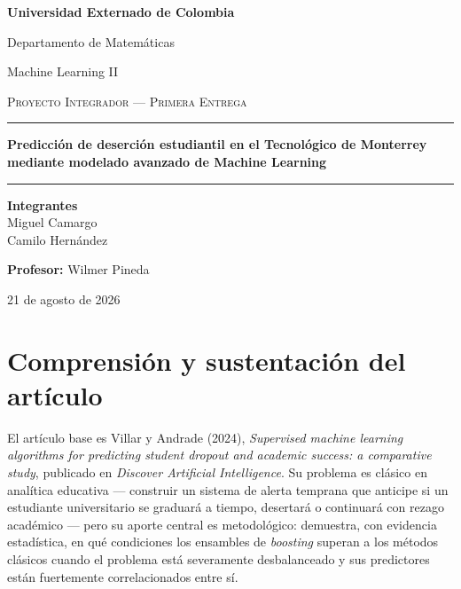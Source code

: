 \documentclass[11pt,a4paper]{article}
\newcommand{\tituloProyecto}{Predicción de deserción estudiantil en el Tecnológico de Monterrey mediante modelado avanzado de Machine Learning}
\newcommand{\nombreCurso}{Machine Learning II}
\newcommand{\nombreProfesor}{Wilmer Pineda}
\begin{document}
\begin{titlepage}
\centering
\vspace*{1.5cm}
{\Large\bfseries Universidad Externado de Colombia\par}
\vspace{0.2cm}
{\large Departamento de Matemáticas\par}
\vspace{0.15cm}
{\large \nombreCurso\par}
\vspace{2.2cm}

{\large\scshape Proyecto Integrador --- Primera Entrega\par}
\vspace{0.4cm}
\rule{0.6\linewidth}{0.4pt}
\vspace{0.6cm}

{\Huge\bfseries \tituloProyecto \par}
\vspace{0.6cm}
\rule{0.6\linewidth}{0.4pt}

\vfill

\begin{minipage}{0.75\linewidth}
\centering
\textbf{Integrantes}\\[0.3cm]
Miguel Camargo \\
Camilo Hernández
\end{minipage}

\vspace{1.2cm}
\textbf{Profesor:} \nombreProfesor

\vspace{1.5cm}
{\large 21 de agosto de 2026 \par}
\vfill
\end{titlepage}

\setcounter{page}{1}

\section{Comprensión y sustentación del artículo}

El artículo base es Villar y Andrade (2024), \textit{Supervised machine learning algorithms for predicting student dropout and academic success: a comparative study}, publicado en \textit{Discover Artificial Intelligence}. Su problema es clásico en analítica educativa --- construir un sistema de alerta temprana que anticipe si un estudiante universitario se graduará a tiempo, desertará o continuará con rezago académico --- pero su aporte central es metodológico: demuestra, con evidencia estadística, en qué condiciones los ensambles de \emph{boosting} superan a los métodos clásicos cuando el problema está severamente desbalanceado y sus predictores están fuertemente correlacionados entre sí.
\end{document}
